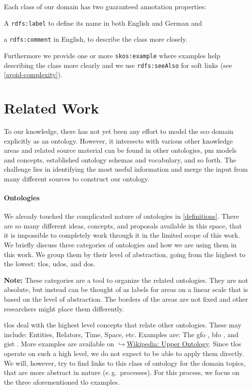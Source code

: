 \documentclass[a4paper, DIV=13, BCOR=0cm]{scrbook}
\newcommand{\eg}{e.\,g.\ }
\newcommand{\prop}[1]{\texttt{#1}}
\newcommand{\link}[2]{\href{#1}{$\hookrightarrow$#2}}
\begin{document}
Each class of our domain has two guaranteed annotation properties:
\begin{inparaenum}
	\item A \prop{rdfs:label} to define its name in both English and German and
	\item a \prop{rdfs:comment} in English, to describe the class more closely.
\end{inparaenum}
Furthermore we provide one or more \prop{skos:example} where examples help describing the class more clearly and we use \prop{rdfs:seeAlso} for soft links (see \autoref{avoid-complexity}).

\section{Related Work}
\label{related-work}
To our knowledge, there has not yet been any effort to model the \gls{sco} domain explicitly as an ontology. However, it intersects with various other knowledge areas and related source material can be found in other ontologies, \gls{pm} models and concepts, established ontology schemas and vocabulary, and so forth. The challenge lies in identifying the most useful information and merge the input from many different sources to construct our ontology.

\paragraph{Ontologies}
We already touched the complicated nature of ontologies in \autoref{definitions}. There are so many different ideas, concepts, and proposals available in this space, that it is impossible to completely work through it in the limited scope of this work. We briefly discuss three categories of ontologies and how we are using them in this work. We group them by their level of abstraction, going from the highest to the lowest: \glspl{tlo}, \glspl{udo}, and \glspl{do}.

\begin{mdframed}
	\textbf{Note:} These categories are a tool to organize the related ontologies. They are not absolute, but instead can be thought of as labels for areas on a linear scale that is based on the level of abstraction. The borders of the areas are not fixed and other researchers might place them differently.
\end{mdframed}

\glspl{tlo} deal with the highest level concepts that relate other ontologies. \cite[p.\,3]{perez1999overview} These may include: Entities, Relators, Time, Space, etc. Examples are: The %
	\gls{gfo} \cite{herre2010general},
	\gls{bfo} \cite{smith2015basic}, and
	\gls{gist} \cite{gist-ontology}.
More examples are available on  \link{https://en.wikipedia.org/wiki/Upper\_ontology\#Available\_upper\_ontologies}{Wikipedia: Upper Ontology}. Since \glspl{tlo} operate on such a high level, we do not expect to be able to apply them directly. We will, however, try to find links to this class of ontology for the domain topics, that are more abstract in nature (\eg processes). For this process, we focus on the three aforementioned \gls{tlo} examples.
\end{document}
